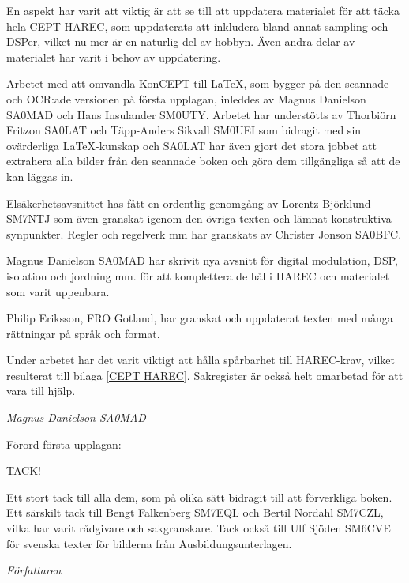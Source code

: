 En aspekt har varit att viktig är att se till att uppdatera materialet för
att täcka hela CEPT HAREC, som uppdaterats att inkludera bland annat sampling
och DSPer, vilket nu mer är en naturlig del av hobbyn. Även andra delar av
materialet har varit i behov av uppdatering.

Arbetet med att omvandla KonCEPT till \LaTeX, som bygger på den scannade och
OCR:ade versionen på första upplagan, inleddes av Magnus Danielson SA0MAD och
Hans Insulander SM0UTY. Arbetet har understötts av Thorbiörn Fritzon SA0LAT och
Täpp-Anders Sikvall SM0UEI som bidragit med sin ovärderliga \LaTeX -kunskap och
SA0LAT har även gjort det stora jobbet att extrahera alla bilder från den
scannade boken och göra dem tillgängliga så att de kan läggas in.

Elsäkerhetsavsnittet has fått en ordentlig genomgång av Lorentz Björklund SM7NTJ
som även granskat igenom den övriga texten och lämnat konstruktiva synpunkter.
Regler och regelverk mm har granskats av Christer Jonson SA0BFC.

Magnus Danielson SA0MAD har skrivit nya avsnitt för digital modulation, DSP,
isolation och jordning mm. för att komplettera de hål i HAREC och materialet
som varit uppenbara.

Philip Eriksson, FRO Gotland, har granskat och uppdaterat texten med många
rättningar på språk och format.

Under arbetet har det varit viktigt att hålla spårbarhet till HAREC-krav,
vilket resulterat till bilaga \ref{CEPT HAREC}.
Sakregister är också helt omarbetad för att vara till hjälp.

\emph{Magnus Danielson SA0MAD}


Förord första upplagan:

TACK!

Ett stort tack till alla dem, som på olika sätt bidragit till att förverkliga
boken. Ett särskilt tack till Bengt Falkenberg SM7EQL och Bertil Nordahl SM7CZL,
vilka har varit rådgivare och sakgranskare. Tack också till Ulf Sjöden SM6CVE
för svenska texter för bilderna från Ausbildungsunterlagen.

\emph{Författaren}
